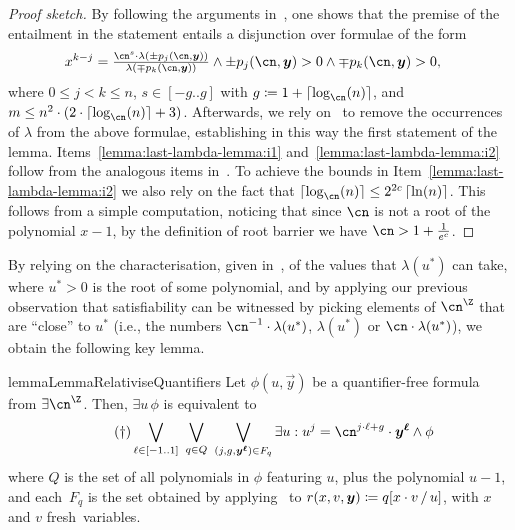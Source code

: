 \begin{proof}[Proof sketch]
  By following the arguments in~\cite[Lemma 3.9]{AvigadY07}, one shows that the
  premise of the entailment in the statement entails a disjunction over
  formulae of the form 
  \begin{align*} 
    & x^{k-j} = \textstyle\frac{\cn^s \cdot \lambda(\pm p_j(\cn,\vec y))}
    {\lambda(\mp p_k(\cn,\vec y))} \land \pm p_j(\cn,\vec y) > 0 \land \mp p_k(\cn,\vec y) > 0,
  \end{align*}
  where $0\leq j < k \leq n$, $s \in [-g..g]$ with $g \coloneqq
  1+\ceil{\log_{\cn}(n)}$, and $m\leq n^2\cdot \left(2 \cdot
  \ceil{\log_{\cn}(n)} + 3\right)$. Afterwards, we rely
  on~ to remove the occurrences of
  $\lambda$ from the above formulae, establishing in this way the first
  statement of the lemma. Items~\eqref{lemma:last-lambda-lemma:i1}
  and~\eqref{lemma:last-lambda-lemma:i2} follow from the analogous items
  in~. To achieve the bounds in
  Item~\eqref{lemma:last-lambda-lemma:i2} we also rely on the fact that
  $\ceil{\log_{\cn}(n)} \leq 2^{2c} \ceil{\ln(n)}$. This follows from a simple
  computation, noticing that since $\cn$ is not a root of the polynomial $x -
  1$, by the definition of root barrier we have $\cn > 1 + \frac{1}{e^c}$.
\end{proof}

By relying on the characterisation, given in~, of
the values that $\lambda(u^*)$ can take, where $u^* > 0$ is the root of some
polynomial, and by applying our previous observation that satisfiability can be
witnessed by picking elements of $\ipow{\cn}$ that are ``close'' to $u^*$ (i.e.,
the numbers $\cn^{-1} \cdot \lambda(u^*)$, $\lambda(u^*)$ or $\cn \cdot
\lambda(u^*)$), we obtain the following key lemma.

\begin{restatable}{lemma}{LemmaRelativiseQuantifiers}
  \label{lemma:relativise-quantifiers}
  Let  $\phi(u,\vec y)$ be a quantifier-free formula from $\exists \ipow{\cn}$.
  Then, $\exists u\,\phi$ is equivalent to
  \begin{equation}
    \tag{$\dagger$}
    \label{eq:lemma14}
    \bigvee_{\ell \in [-1..1]}\ 
    \bigvee_{q \in Q}\ 
    \bigvee_{(j,g,\vec y^{\vec \ell}) \in F_q}
    \exists u : u^{j} = \cn^{j \cdot \ell + g} \cdot \vec y^{\vec \ell} \land \phi
  \end{equation}
  where $Q$ is the set of all polynomials in $\phi$ featuring $u$, 
  plus the polynomial $u-1$,
  and each~$F_q$ is the set obtained by applying~
  to $r(x,v,\bm y) \coloneqq q[x \cdot v\,/\,u]$, with $x$ and $v$ 
  fresh~variables.
\end{restatable}

